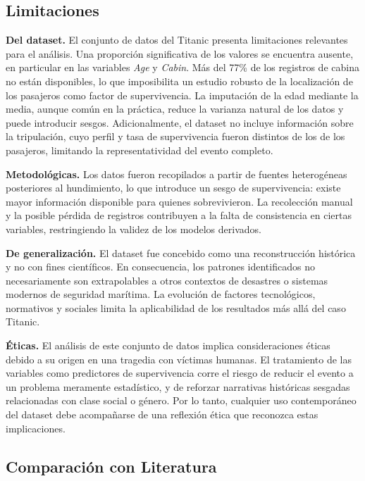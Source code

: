\documentclass[conference]{IEEEtran}
\begin{document}
\subsection{Limitaciones}

\textbf{Del dataset.} El conjunto de datos del Titanic presenta limitaciones relevantes para el análisis. Una proporción significativa de los valores se encuentra ausente, en particular en las variables \textit{Age} y \textit{Cabin}. Más del 77\% de los registros de cabina no están disponibles, lo que imposibilita un estudio robusto de la localización de los pasajeros como factor de supervivencia. La imputación de la edad mediante la media, aunque común en la práctica, reduce la varianza natural de los datos y puede introducir sesgos. Adicionalmente, el dataset no incluye información sobre la tripulación, cuyo perfil y tasa de supervivencia fueron distintos de los de los pasajeros, limitando la representatividad del evento completo.

\textbf{Metodológicas.} Los datos fueron recopilados a partir de fuentes heterogéneas posteriores al hundimiento, lo que introduce un sesgo de supervivencia: existe mayor información disponible para quienes sobrevivieron. La recolección manual y la posible pérdida de registros contribuyen a la falta de consistencia en ciertas variables, restringiendo la validez de los modelos derivados.

\textbf{De generalización.} El dataset fue concebido como una reconstrucción histórica y no con fines científicos. En consecuencia, los patrones identificados no necesariamente son extrapolables a otros contextos de desastres o sistemas modernos de seguridad marítima. La evolución de factores tecnológicos, normativos y sociales limita la aplicabilidad de los resultados más allá del caso Titanic.

\textbf{Éticas.} El análisis de este conjunto de datos implica consideraciones éticas debido a su origen en una tragedia con víctimas humanas. El tratamiento de las variables como predictores de supervivencia corre el riesgo de reducir el evento a un problema meramente estadístico, y de reforzar narrativas históricas sesgadas relacionadas con clase social o género. Por lo tanto, cualquier uso contemporáneo del dataset debe acompañarse de una reflexión ética que reconozca estas implicaciones.

\subsection{Comparación con Literatura}
\end{document}
